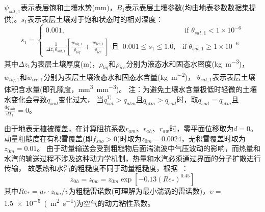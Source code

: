 $\psi_{sat,1}$表示表层饱和土壤水势(mm)，$B_1$表示表层土壤\citep{clapp1978empirical}参数(均由地表参数数据集提供)。$s_1$表示表层土壤对于饱和状态时的相对湿度：
\begin{equation}
s_{1}= \begin{cases}
   0.001, & \text { if } \theta_{sat, 1}<1 \times 10^{-6} \\ 
   \frac{1}{\Delta z_{1} \theta_{sat, 1}}\left[\frac{w_{liq, 1}}{\rho_{liq}}+\frac{w_{ice, 1}}{\rho_{ice}}\right]  \text{ 且  }\  0.001 \leq s_{1} \leq 1.0, &\text {if } \theta_{sat, 1} \geq 1 \times 10^{-6}
   \end{cases}
\end{equation}
其中$\Delta z_{1}$为表层土壤厚度(m)，$\rho_{liq}$和$\rho_{ice}$分别为液态水和固态水密度(\unit{kg.m^{-3}})，
$w_{liq,1}$和$w_{ice,1}$分别为表层土壤液态水和固态水含量(\unit{kg.m^{-2}})，
$\theta_{sat,1}$表示表层土壤体积含水量(即孔隙度，\unit{mm^3.mm^{-3}})。
注：为避免土壤水含量极低时轻微的土壤水变化会导致$q_{soil}$变化过大，
当$q_{sat}^{T_1}>q_{atm}$且$q_{atm}>q_{soil}$时，取$q_{soil} = q_{atm}$且$\frac{dq_{soil}}{dT_1} = 0$。


由于地表无植被覆盖，在计算阻抗系数$r_{am}$、$r_{ah}$、$r_{aw}$时，零平面位移取为$d=0$。
动量粗糙度在有积雪覆盖(即$f_{sno}>0$)时取为$z_{0m}=0.0024$，无积雪覆盖时取为$z_{0m}=0.01$。
由于动量输送会受到粗糙物后面湍流波中气压波动的影响，而热量和水汽的输送过程不涉及这种动力学机制，热量和水汽必须通过界面的分子扩散进行传输，
故感热和水汽的粗糙度不同于动量粗糙度，根据~\citet{zeng1998effect}：
\begin{equation}\label{z0hw}
z_{0 h} = z_{0 w} = z_{0 m} \exp \left[-0.13\left(Re_{*}\right)^{0.45}\right]
\end{equation}
其中$Re_{*} = u_{*} \cdot z_{0 m} / v$为粗糙雷诺数(可理解为最小湍涡的雷诺数)，$\upsilon=$ \qty{1.5e-5}{(m^2.s^{-1}})为空气的动力粘性系数。


